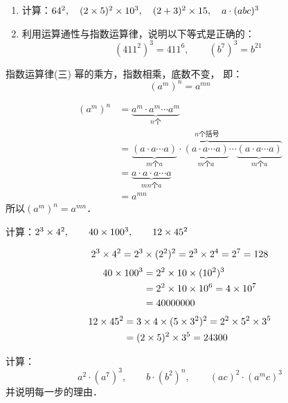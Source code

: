 \begin{ex}
	\begin{enumerate}
		\item 计算：$64^2,\quad (2\times5)^2\times10^3,\quad (2+3)^2\times15,\quad  a\cdot (abc)^3$
		\item 利用运算通性与指数运算律，说明以下等式是正确的：
		\[ (411^2)^3  = 411^6,\qquad (b^7)^3=b^{21} \]
	\end{enumerate}   
\end{ex}

\begin{blk}{指数运算律(三)}
	幂的乘方，指数相乘，底数不变，
	即：
	\[(a^m)^n=a^{mn}\]
\end{blk}

\begin{note}
	\begin{align*}
	(a^m)^n&= \underbrace{a^m\cdot a^m\cdots a^m}_{\text{$n$个}}     \tag{乘方的意义}\\  
	&=\overbrace{\underbrace{(a\cdot a\cdots a)}_{\text{$m$个$a$}}\cdot \underbrace{(a\cdot a\cdots a)}_{\text{$m$个$a$}}\cdots \underbrace{(a\cdot a\cdots a)}_{\text{$m$个$a$}}}^{\text{$n$个括号}}\\
	&=\underbrace{a\cdot a\cdot a\cdots a}_{\text{$mn$个$a$}}\tag{乘法结合律}\\
	&=a^{mn}\tag{乘方的意义}
	\end{align*}
	所以$(a^m)^n=a^{mn}$．
\end{note}

\begin{example}
	计算：$2^3\times 4^2,\qquad 40\times 100^3,\qquad 12\times 45^2$
\end{example}

\begin{solution}
	$$2^3\times 4^2=2^3\times (2^2)^2=2^3\times 2^4=2^7=128$$
	\[\begin{split}
	40\times 100^3&=2^2\times 10\times(10^2)^3\\
	&=2^2\times 10\times 10^6=4\times 10^7\\
	&=40000000
	\end{split}\]
	\[\begin{split}
	12\times 45^2&=3\times 4\times (5\times 3^2)^2=2^2\times 5^2\times 3^5\\
	&=(2\times 5)^2 \times 3^5=24300
	\end{split}\]
\end{solution}

\begin{example}
	计算：
	$$a^2\cdot (a^7)^3,\qquad b\cdot (b^2)^n,\qquad (ac)^2\cdot (a^m c)^3$$
	并说明每一步的理由．
\end{example}


